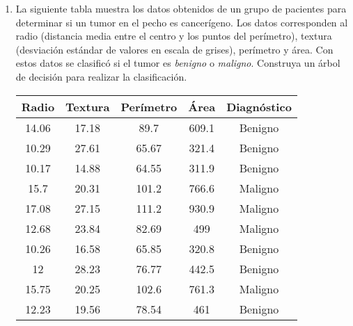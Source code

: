 \documentclass[
10pt, %
a4paper, %
]{article}
\begin{document}
\begin{enumerate}
    \item La siguiente tabla muestra los datos obtenidos de un grupo de pacientes para determinar si un tumor en el pecho es 
	cancerígeno. Los datos corresponden al radio (distancia media entre el centro y los puntos del perímetro), textura 
	(desviación estándar de valores en escala de grises), perímetro y área. Con estos datos se clasificó si el tumor 
	es \textit{benigno} o \textit{maligno}. Construya un árbol de decisión para realizar la clasificación.
	\begin{table}[h]
		\centering
		\begin{tabular}{ccccc}
			\toprule
			Radio & Textura & Perímetro & Área & Diagnóstico \\ \midrule
			14.06 & 17.18 & 89.7  & 609.1 & Benigno \\
			10.29 & 27.61 & 65.67 & 321.4 & Benigno \\
			10.17 & 14.88 & 64.55 & 311.9 & Benigno \\
			15.7  & 20.31 & 101.2 & 766.6 & Maligno \\
			17.08 & 27.15 & 111.2 & 930.9 & Maligno \\
			12.68 & 23.84 & 82.69 & 499   & Maligno \\
			10.26 & 16.58 & 65.85 & 320.8 & Benigno \\
			12    & 28.23 & 76.77 & 442.5 & Benigno \\
			15.75 & 20.25 & 102.6 & 761.3 & Maligno \\
			12.23 & 19.56 & 78.54 & 461   & Benigno \\
			\bottomrule
		\end{tabular}
	\end{table}


\end{enumerate}
\end{document}
